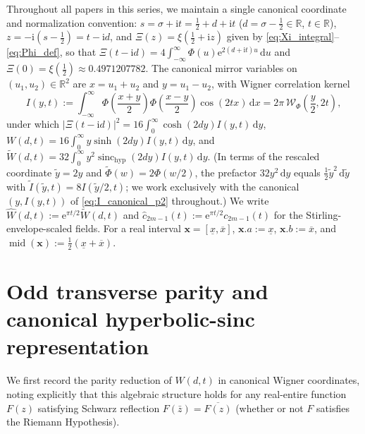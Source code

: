 \documentclass[11pt,a4paper,reqno]{amsart}
\theoremstyle{definition}
\theoremstyle{remark}
\numberwithin{equation}{section}
\newcommand{\dd}{\mathrm{d}}
\newcommand{\ii}{\mathrm{i}}
\newcommand{\ee}{\mathrm{e}}
\newcommand{\Wig}{\mathcal{W}}
\newcommand{\Wtil}{\widetilde{W}}
\newcommand{\What}{\widehat{W}}
\newcommand{\sinch}{\operatorname{sinc}_{\mathrm{hyp}}}
\begin{document}
Throughout all papers in this series, we maintain a single canonical coordinate and normalization convention: $s = \sigma + \ii t = \frac{1}{2} + d + \ii t$ ($d = \sigma - \frac{1}{2} \in \mathbb{R}$, $t \in \mathbb{R}$), $z = -\ii(s-\frac{1}{2}) = t - \ii d$, and $\Xi(z) = \xi(\frac{1}{2}+\ii z)$ given by \eqref{eq:Xi_integral}--\eqref{eq:Phi_def}, so that $\Xi(t-\ii d) = 4\int_{-\infty}^\infty \Phi(u)\ee^{2(d+\ii t)u}\,\dd u$ and $\Xi(0) = \xi(\frac{1}{2}) \approx 0.4971207782$. The canonical mirror variables on $(u_1, u_2) \in \mathbb{R}^2$ are $x = u_1 + u_2$ and $y = u_1 - u_2$, with Wigner correlation kernel
\begin{equation}\label{eq:I_canonical_p2}
I(y,t) := \int_{-\infty}^\infty \Phi\!\left(\frac{x+y}{2}\right)\Phi\!\left(\frac{x-y}{2}\right)\cos(2t x)\,\dd x = 2\pi\,\Wig_\Phi\!\left(\frac{y}{2}, 2t\right),
\end{equation}
under which $|\Xi(t-\ii d)|^2 = 16\int_0^\infty \cosh(2dy)I(y,t)\,\dd y$, $W(d,t) = 16\int_0^\infty y\sinh(2dy)I(y,t)\,\dd y$, and $\Wtil(d,t) = 32\int_0^\infty y^2\sinch(2dy)I(y,t)\,\dd y$. (In terms of the rescaled coordinate $\tilde{y} = 2y$ and $\widetilde{\Phi}(w) = 2\Phi(w/2)$, the prefactor $32 y^2\,\dd y$ equals $\frac{1}{2}\tilde{y}^2\,\dd\tilde{y}$ with $\widetilde{I}(\tilde{y},t) = 8 I(\tilde{y}/2, t)$; we work exclusively with the canonical $(y, I(y,t))$ of \eqref{eq:I_canonical_p2} throughout.) We write $\What(d,t) := \ee^{\pi t/2}\Wtil(d,t)$ and $\widehat{c}_{2m-1}(t) := \ee^{\pi t/2}c_{2m-1}(t)$ for the Stirling-envelope-scaled fields. For a real interval $\mathbf{x} = [\underline{x}, \overline{x}]$, $\mathbf{x}.a := \underline{x}$, $\mathbf{x}.b := \overline{x}$, and $\operatorname{mid}(\mathbf{x}) := \frac{1}{2}(\underline{x}+\overline{x})$.

\section{Odd transverse parity and canonical hyperbolic-sinc representation}\label{sec:parity}

We first record the parity reduction of $W(d,t)$ in canonical Wigner coordinates, noting explicitly that this algebraic structure holds for any real-entire function $F(z)$ satisfying Schwarz reflection $F(\bar{z}) = \overline{F(z)}$ (whether or not $F$ satisfies the Riemann Hypothesis).
\end{document}
